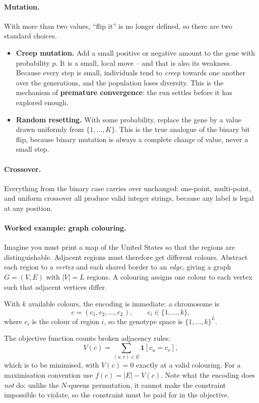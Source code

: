 \documentclass[11pt,a4paper]{article}
\begin{document}
\paragraph{Mutation.} With more than two values, ``flip it'' is no longer
defined, so there are two standard choices.
\begin{itemize}
\item \textbf{Creep mutation.} Add a small positive or negative amount to the
      gene with probability $p$. It is a small, local move -- and that is
      also its weakness. Because every step is small, individuals tend to
      \emph{creep} towards one another over the generations, and the
      population loses diversity. This is the mechanism of
      \textbf{premature convergence}: the run settles before it has explored
      enough.
\item \textbf{Random resetting.} With some probability, replace the gene by a
      value drawn uniformly from $\{1,\ldots,K\}$. This is the true analogue
      of the binary bit flip, because binary mutation is always a complete
      change of value, never a small step.
\end{itemize}

\paragraph{Crossover.} Everything from the binary case carries over
unchanged: one-point, multi-point, and uniform crossover all produce valid
integer strings, because any label is legal at any position.

\paragraph{Worked example: graph colouring.}
Imagine you must print a map of the United States so that the regions are
distinguishable. Adjacent regions must therefore get different colours.
Abstract each region to a \emph{vertex} and each shared border to an
\emph{edge}, giving a graph $G=(V,E)$ with $|V|=L$ regions. A colouring
assigns one colour to each vertex such that adjacent vertices differ.

With $k$ available colours, the encoding is immediate: a chromosome is
\[
  c=(c_1,c_2,\ldots,c_L),\qquad c_i\in\{1,\ldots,k\},
\]
where $c_i$ is the colour of region $i$, so the genotype space is
$\{1,\ldots,k\}^L$.

The objective function counts broken adjacency rules:
\[
  V(c)=\sum_{(u,v)\in E}\mathbf 1\!\left[c_u=c_v\right],
\]
which is to be minimised, with $V(c)=0$ exactly at a valid colouring. For a
maximisation convention use $f(c)=|E|-V(c)$. Note what the encoding does
\emph{not} do: unlike the $N$-queens permutation, it cannot make the
constraint impossible to violate, so the constraint must be paid for in the
objective.
\end{document}
